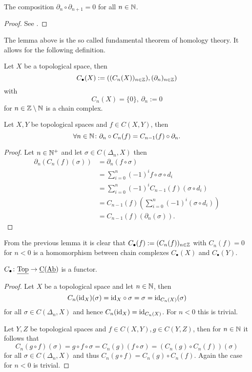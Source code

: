 \begin{lemma}
  The composition $\partial_n \circ \partial_{n+1} = 0$ for all $n \in \mathbb{N}$.
\end{lemma}

\begin{proof}
  See \cite[Theorem 29.1]{MunAlTop}.
\end{proof}

The lemma above is the so called fundamental theorem of homology theory. It allows for the following definition.

\begin{defin}
  Let $X$ be a topological space, then \[C_\bullet(X) := ((C_n(X))_{n\in \mathbb{Z}}), (\partial_n)_{n\in \mathbb{Z}})\] with
  \[C_n(X) = \{0\}, \: \partial_n := 0\] for $n \in \mathbb{Z}\setminus\mathbb{N}$ is a chain complex.
\end{defin}

\begin{lemma}
  Let $X, Y$ be topological spaces and $f \in C(X, Y)$, then \[\forall n\in \mathbb{N}\colon \partial_n \circ C_n(f) = C_{n-1}(f) \circ \partial_n.\]
\end{lemma}

\begin{proof}
  Let $n \in \mathbb{N}^+$ and let $\sigma \in C(\Delta_n, X)$ then
  \begin{align*}
    \partial_n(C_n(f)(\sigma)) &= \partial_n(f\circ\sigma) \\
    &= \sum\limits_{i=0}^n(-1)^if\circ\sigma\circ d_i \\
    &= \sum\limits_{i=0}^n(-1)^iC_{n-1}(f)(\sigma\circ d_i) \\
    &= C_{n-1}(f)(\sum\limits_{i=0}^n(-1)^i(\sigma\circ d_i)) \\
    & = C_{n-1}(f)(\partial_n(\sigma)).
  \end{align*}
\end{proof}

From the previous lemma it is clear that $C_\bullet(f) := (C_n(f))_{n\in \mathbb{Z}}$ with $C_n(f) = 0$ for $n < 0$ is a homomorphism between chain complexes $C_\bullet(X)$ and $C_\bullet(Y)$.

\begin{lemma}\label{lem:cfunc}
  $C_\bullet\colon \underline{\rm Top} \to \underline{\rm C}(\underline{\rm Ab})$ is a functor.
\end{lemma}

\begin{proof}
  Let $X$ be a topological space and let $n \in \mathbb{N}$, then \[C_n({\rm id}_X)(\sigma) = {\rm id}_X\circ \sigma = \sigma = {\rm id}_{C_n(X)}(\sigma)\]
  for all $\sigma \in C(\Delta_n, X)$ and hence $C_n({\rm id}_X) = {\rm id}_{C_n(X)}$.
  For $n < 0$ this is trivial.

  Let $Y, Z$ be topological spaces and $f \in C(X, Y), g\in C(Y, Z)$, then for $n\in \mathbb{N}$ it follows that \[C_n(g\circ f)(\sigma) = g\circ f \circ \sigma = C_n(g)(f\circ \sigma) = (C_n(g) \circ C_n(f))(\sigma)\] for all $\sigma \in C(\Delta_n, X)$ and thus $C_n(g \circ f) = C_n(g) \circ C_n(f)$.
  Again the case for $n < 0$ is trivial.
\end{proof}

